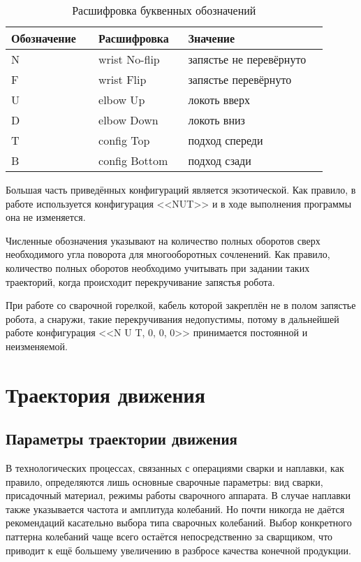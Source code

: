 \begin{longtable}[H]{|p{0.25\linewidth}|p{0.25\linewidth}|p{0.4\linewidth}|}
    \caption{Расшифровка буквенных обозначений}
    \label{tab:RobotConfig} \\
    \hline
    Обозначение & Расшифровка   & Значение                \\ \hline
    N           & wrist No-flip & запястье не перевёрнуто \\ \hline
    F           & wrist Flip    & запястье перевёрнуто    \\ \hline
    U           & elbow Up      & локоть вверх            \\ \hline
    D           & elbow Down    & локоть вниз             \\ \hline
    T           & config Top    & подход спереди          \\ \hline
    B           & config Bottom & подход сзади            \\ \hline
\end{longtable}

Большая часть приведённых конфигураций является экзотической.
Как правило, в работе используется конфигурация <<NUT>> и в ходе выполнения программы она не изменяется.

Численные обозначения указывают на количество полных оборотов сверх необходимого угла поворота для многооборотных сочленений.
Как правило, количество полных оборотов необходимо учитывать при задании таких траекторий, когда происходит перекручивание запястья робота.

При работе со сварочной горелкой, кабель которой закреплён не в полом запястье робота, а снаружи, такие перекручивания недопустимы, потому в дальнейшей работе конфигурация <<N U T, 0, 0, 0>> принимается постоянной и неизменяемой.


\section{Траектория движения}

\subsection{Параметры траектории движения} \label{subsec:TrajectoryParameters}
В технологических процессах, связанных с операциями сварки и наплавки, как правило, определяются лишь основные сварочные параметры: вид сварки, присадочный материал, режимы работы сварочного аппарата.
В случае наплавки также указывается частота и амплитуда колебаний.
Но почти никогда не даётся рекомендаций касательно выбора типа сварочных колебаний.
Выбор конкретного паттерна колебаний чаще всего остаётся непосредственно за сварщиком, что приводит к ещё большему увеличению в разбросе качества конечной продукции.

